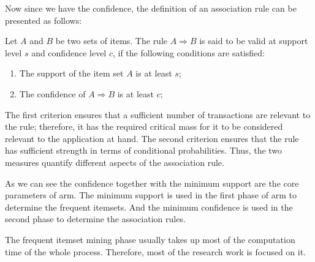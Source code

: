 Now since we have the confidence, the definition of an association rule can be presented as follows:
\begin{definition}
    Let $A$ and $B$ be two sets of items.
    The rule $A \Rightarrow B$ is said to be valid at support level $s$ and confidence level $c$, if the following conditions are satisfied:
    \begin{enumerate}
        \item The support of the item set $A$ is at least $s$;
        \item The confidence of $A \Rightarrow B$ is at least $c$;
    \end{enumerate}
    The first criterion ensures that a sufficient number of transactions are relevant to the rule; therefore, it has the required critical mass for it to be considered relevant to the application at hand.
    The second criterion ensures that the rule has sufficient strength in terms of conditional probabilities.
    Thus, the two measures quantify different aspects of the association rule.
\end{definition}
As we can see the confidence together with the minimum support are the core parameters of \acl{arm}.
The minimum support is used in the first phase of \acl{arm} to determine the frequent itemsets.
And the minimum confidence is used in the second phase to determine the association rules.

The frequent itemset mining phase usually takes up most of the computation time of the whole process.
Therefore, most of the research work is focused on it.

